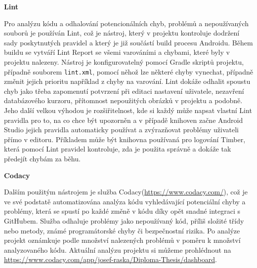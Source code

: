 \documentclass[czech,master,public,dept460,male,java,cpdeclaration]{diploma}
\begin{document}
\noindent
 \textbf{Lint}


 Pro analýzu kódu a odhalování potencionálních chyb, problémů a nepoužívaných souborů je používán Lint,
  což je nástroj, který v projektu kontroluje dodržení sady poskytnutých pravidel a který
  je již součástí build procesu Androidu. Během buildu se vytváří Lint Report
  se všemi varováními a chybami, které byly v projektu nalezeny. Nástroj je konfigurovatelný pomocí
  Gradle skriptů projektu, případně souborem \texttt{lint.xml}, pomocí něhož lze některé chyby
  vynechat, případně změnit jejich prioritu například z chyby na varování.
  Lint dokáže odhalit spoustu chyb jako třeba zapomenutí potvrzení při editaci nastavení uživatele,
  nezavření databázového kurzoru, přítomnost nepoužitých obrázků v projektu a podobně.
  Jeho další velkou výhodou je rozšiřitelnost, kde si každý může napsat vlastní Lint pravidla pro to, na co chce být upozorněn
  a v případě knihoven začne Android Studio jejich pravidla automaticky používat a zvýrazňovat problémy uživateli
  přímo v editoru.
  Příkladem může být knihovna používaná pro logování Timber, která pomocí Lint pravidel
  kontroluje, zda je použita správně a dokáže tak předejít chybám za běhu.

\noindent
\textbf{Codacy}


Dalším použitým nástrojem je služba Codacy(\url{https://www.codacy.com/}), což je ve své podstatě
automatizována analýza kódu vyhledávající potenciální chyby a problémy, která se spustí po každé změně v kódu
díky opět snadné integraci s GitHubem. Služba odhaluje problémy jako nepoužívaný kód, příliš složité
třídy nebo metody, známé programátorské chyby či bezpečnostní rizika. Po analýze projekt oznámkuje podle
množství nalezených problémů v poměru k množství analyzovaného kódu. Aktuální analýzu projektu si můžeme prohlédnout
na \url{https://www.codacy.com/app/josef-raska/Diploma-Thesis/dashboard}.
\end{document}
